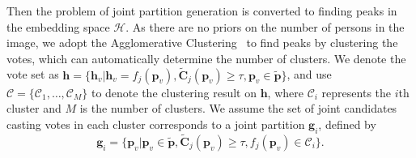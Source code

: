 \documentclass[10pt,twocolumn,letterpaper]{article}
\begin{document}
Then the problem of joint partition generation is converted to finding peaks in the  embedding space $\mathcal{H}$. As there are no  priors on the number of persons in the image,  we adopt the  Agglomerative Clustering~\cite{bourdev2009poselets} to find  peaks by clustering the  votes, which  can automatically determine the number of clusters. We denote the vote set as $\mathbf{h}{=}\{\mathbf{h}_v|\mathbf{h}_v{=}f_j(\mathbf{p}_v), \tilde{\mathbf{C}}_{j}(\mathbf{p}_v){\geq}\tau, \mathbf{p}_v{\in}\tilde{\mathbf{p}} \}$, and use $\mathcal{C}{=}\{\mathcal{C}_1,\ldots,\mathcal{C}_M\}$ to denote the clustering result on $\mathbf{h}$, where $\mathcal{C}_i$ represents the $i$th cluster and $M$ is the number of clusters. We assume the set of joint candidates casting votes in each cluster corresponds to a joint partition $\mathbf{g}_i$, defined by
\begin{equation}\label{eq:person_partition}
\mathbf{g}_i = \{\mathbf{p}_v | \mathbf{p}_v \in \tilde{\mathbf{p}}, \tilde{\mathbf{C}}_{j}(\mathbf{p}_v) \geq \tau, f_j(\mathbf{p}_v) \in \mathcal{C}_i\}.
\end{equation}
\end{document}

